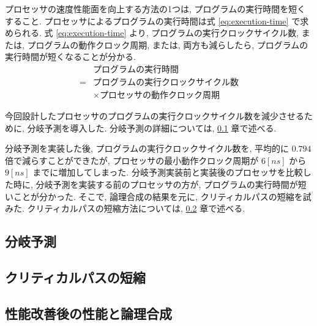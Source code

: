 \documentclass[../main.tex]{subfiles}
\begin{document}
  プロセッサの速度性能面を向上する方法の1つは, プログラムの実行時間を短くすること.
  プロセッサによるプログラムの実行時間は式 \ref{eq:execution-time} で求められる.
  式 \ref{eq:execution-time} より, プログラムの実行クロックサイクル数, 
  または, プログラムの動作クロック周期, 
  または, 両方も減らしたら, プログラムの実行時間が短くなることが分かる.
  \begin{equation}
    \begin{aligned}
      &プログラムの実行時間 \\
      = &プログラムの実行クロックサイクル数 \\
      &\times プロセッサの動作クロック周期
      \label{eq:execution-time}
    \end{aligned}
  \end{equation}

  今回設計したプロセッサのプログラムの実行クロックサイクル数を減少させるために, 分岐予測を導入した.
  分岐予測の詳細については, \ref{subsection:jump-prediction} 章で述べる.

  分岐予測を実装した後, プログラムの実行クロックサイクル数を, 
  平均的に $0.794$ 倍で減らすことができたが, %
  プロセッサの最小動作クロック周期が $6[ns]$ から $9[ns]$ までに増加してしまった.
  分岐予測実装前と実装後のプロセッサを比較した時に, 
  分岐予測を実装する前のプロセッサの方が, 
  プログラムの実行時間が短いことが分かった.
  そこで, 論理合成の結果を元に, クリティカルパスの短縮を試みた.
  クリティカルパスの短縮方法については, \ref{subsection:critical-path} 章で述べる.

  \subsection{分岐予測} \label{subsection:jump-prediction}

  \subsection{クリティカルパスの短縮} \label{subsection:critical-path}
  

  \subsection{性能改善後の性能と論理合成}
  
\end{document}
